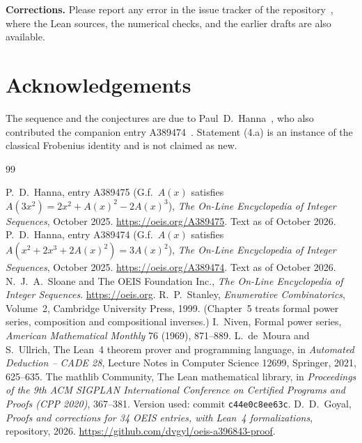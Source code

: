 \documentclass[11pt,a4paper]{article}
\theoremstyle{definition}
\theoremstyle{remark}
\newcommand{\para}[1]{\par\medskip\noindent\textbf{#1}\enspace}
\begin{document}
\para{Corrections.} Please report any error in the issue tracker of the repository~\cite{repo}, where the Lean
sources, the numerical checks, and the earlier drafts are also available.

\section*{Acknowledgements}
The sequence and the conjectures are due to Paul~D.~Hanna~\cite{oeis}, who also contributed the companion entry
A389474~\cite{oeisother}. Statement (4.a) is an instance of the classical Frobenius identity and is not claimed as new.

\begin{thebibliography}{99}\small
\raggedright
{} P.~D.~Hanna, entry A389475 (G.f.\ $A(x)$ satisfies $A(3x^2)=2x^2+A(x)^2-2A(x)^3$), \emph{The On-Line Encyclopedia of Integer Sequences}, October 2025. \url{https://oeis.org/A389475}. Text as of October 2026.
 P.~D.~Hanna, entry A389474 (G.f.\ $A(x)$ satisfies $A(x^2+2x^3+2A(x)^2)=3A(x)^2$), \emph{The On-Line Encyclopedia of Integer Sequences}, October 2025. \url{https://oeis.org/A389474}. Text as of October 2026.
 N.~J.~A.~Sloane and The OEIS Foundation Inc., \emph{The On-Line Encyclopedia of Integer Sequences}. \url{https://oeis.org}.
 R.~P.~Stanley, \emph{Enumerative Combinatorics}, Volume~2, Cambridge University Press, 1999. (Chapter~5 treats formal power series, composition and compositional inverses.)
 I.~Niven, Formal power series, \emph{American Mathematical Monthly} 76 (1969), 871--889.
 L.~de~Moura and S.~Ullrich, The Lean~4 theorem prover and programming language, in \emph{Automated Deduction -- CADE 28}, Lecture Notes in Computer Science 12699, Springer, 2021, 625--635.
 The mathlib Community, The Lean mathematical library, in \emph{Proceedings of the 9th ACM SIGPLAN International Conference on Certified Programs and Proofs (CPP 2020)}, 367--381. Version used: commit \texttt{c44e0c8ee63c}.
 D.~D.~Goyal, \emph{Proofs and corrections for 34 OEIS entries, with Lean~4 formalizations}, repository, 2026. \url{https://github.com/dvgyl/oeis-a396843-proof}.
\end{thebibliography}
\end{document}
